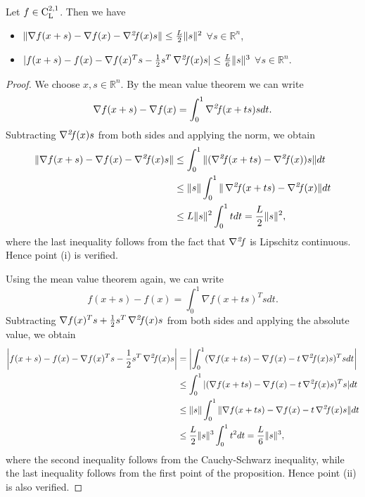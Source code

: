 \documentclass[10pt,a4paper]{article}
\begin{document}
\begin{proposition}\label{prop:arc}
	Let $f\in \mathord{\mathrm{C^{2,1}_{L}}}$. Then we have
	\begin{itemize}
		\item[(i)] $\|\nabla f(x + s) - \nabla f(x) - \operatorname*{\mathit{\nabla^2 \!f}}(x)s\| \leq \frac{L}{2}\|s\|^2$ $\forall s \in \mathbb{R}^n$,
		\item[(ii)] $|f(x + s) - f(x) - \nabla f(x)^T s - \frac{1}{2}s^T \operatorname*{\mathit{\nabla^2 \!f}}(x)s| \leq \frac{L}{6}\|s\|^3$ $\forall s \in \mathbb{R}^n$.
	\end{itemize}
\end{proposition}
\begin{proof}
	We choose $x, s \in \mathbb{R}^n$. By the mean value theorem we can write
	\begin{equation*}
		\nabla f(x + s) - \nabla f(x) = \int_0^1 \operatorname*{\mathit{\nabla^2 \!f}}(x + ts) sdt.
	\end{equation*}
	Subtracting $\operatorname*{\mathit{\nabla^2 \!f}}(x)s$ from both sides and applying the norm, we obtain
	\begin{align*}
		\|\nabla f(x + s) - \nabla f(x) - \operatorname*{\mathit{\nabla^2 \!f}}(x)s\| &\leq \int_0^1 \|(\operatorname*{\mathit{\nabla^2 \!f}}(x + ts) - \operatorname*{\mathit{\nabla^2 \!f}}(x))s\| dt \\
		&\leq \|s\| \int_0^1 \|\operatorname*{\mathit{\nabla^2 \!f}}(x + ts) - \operatorname*{\mathit{\nabla^2 \!f}}(x)\| dt \\
		&\leq L\|s\|^2 \int_0^1 t dt = \frac{L}{2}\|s\|^2,
	\end{align*}
where the last inequality follows from the fact that $\operatorname*{\mathit{\nabla^2 \!f}}$ is Lipschitz continuous. Hence point (i) is verified.
\par Using the mean value theorem again, we can write
	\begin{equation*}
		f(x + s) - f(x) = \int_0^1 \nabla f(x + ts)^T s dt.
	\end{equation*}
	Subtracting $\nabla f(x)^T s + \frac{1}{2}s^T \operatorname*{\mathit{\nabla^2 \!f}}(x)s$ from both sides and applying the absolute value, we obtain
	\begin{align*}
		\left|f(x + s) - f(x) - \nabla f(x)^T s - \frac{1}{2}s^T \operatorname*{\mathit{\nabla^2 \!f}}(x)s\right| &= \left|\int_0^1 (\nabla f(x + ts) - \nabla f(x) - t\operatorname*{\mathit{\nabla^2 \!f}}(x)s)^T s dt\right| \\
		&\leq \int_0^1 |(\nabla f(x + ts) - \nabla f(x) - t\operatorname*{\mathit{\nabla^2 \!f}}(x)s)^T s| dt \\
		&\leq \|s\| \int_0^1 \|\nabla f(x + ts) - \nabla f(x) - t\operatorname*{\mathit{\nabla^2 \!f}}(x)s\| dt \\
		&\leq \frac{L}{2}\|s\|^3 \int_0^1 t^2 dt = \frac{L}{6}\|s\|^3,
	\end{align*}
	where the second inequality follows from the Cauchy-Schwarz inequality, while the last inequality follows from the first point of the proposition. Hence point (ii) is also verified.
\end{proof}
\end{document}
